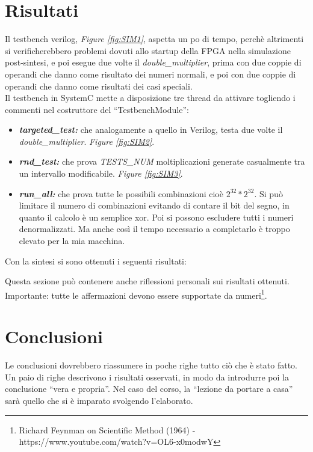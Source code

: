 \documentclass[]{IEEEtran}
\begin{document}
\section{Risultati}
Il testbench verilog, {\it Figure \ref{fig:SIM1}}, aspetta un po di tempo, perchè altrimenti si verificherebbero problemi dovuti allo startup della FPGA nella simulazione post-sintesi, e poi esegue due volte il {\it double\_multiplier}, prima con due coppie di operandi che danno come risultato dei numeri normali, e poi con due coppie di operandi che danno come risultati dei casi speciali. \\

Il testbench in SystemC mette a disposizione tre thread da attivare togliendo i commenti nel costruttore del ``TestbenchModule'':
\begin{itemize}
    \item {\it\bf targeted\_test:} che analogamente a quello in Verilog, testa due volte il {\it double\_multiplier}. {\it Figure \ref{fig:SIM2}}.
    \item {\it\bf rnd\_test:} che prova {\it TESTS\_NUM} moltiplicazioni generate casualmente tra un intervallo modificabile. {\it Figure \ref{fig:SIM3}}.
    \item {\it\bf run\_all:} che prova tutte le possibili combinazioni cioè \(2^{32} * 2^{32}\). Si può limitare il numero di combinazioni evitando di contare il bit del segno, in quanto il calcolo è un semplice xor. Poi si possono escludere tutti i numeri denormalizzati. Ma anche così il tempo necessario a completarlo è troppo elevato per la mia macchina.
\end{itemize}
Con la sintesi si sono ottenuti i seguenti risultati:


















Questa sezione può contenere anche riflessioni personali sui risultati ottenuti. Importante: tutte le affermazioni devono essere supportate da numeri\footnote{Richard Feynman on Scientific Method (1964) -\\ https://www.youtube.com/watch?v=OL6-x0modwY}.

\section{Conclusioni}
Le conclusioni dovrebbero riassumere in poche righe  tutto ciò che è stato fatto. Un paio di righe descrivono i risultati osservati, in modo da introdurre poi la conclusione ``vera e propria''. Nel caso del corso, la ``lezione da portare a casa'' sarà quello che si è imparato svolgendo l'elaborato.
\end{document}
